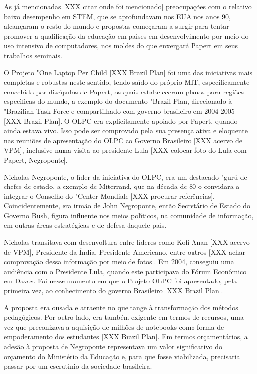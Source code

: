 \documentclass[
12pt,		%
openright,	%
twoside,  %
a4paper,			%
chapter=TITLE,		%
english,			%
french,				%
spanish,			%
brazil				%
]{USPSC-classe/USPSC}
\begin{document}
As j\'a mencionadas [XXX citar onde foi mencionado] preocupa\c{c}\~oes com o relativo baixo desempenho em STEM, que se aprofundavam nos EUA nos anos 90, alcan\c{c}aram o resto do mundo e propostas come\c{c}aram a surgir para tentar promover a qualifica\c{c}\~ao da educa\c{c}\~ao em pa\'{\i}ses em desenvolvimento por meio do uso intensivo de computadores, nos moldes do que enxergar\'a Papert em seus trabalhos seminais.




O Projeto "One Laptop Per Child [XXX Brazil Plan] foi uma das iniciativas mais completas e robustas neste sentido, tendo sa\'{\i}do  do pr\'oprio MIT, especificamente concebido por disc\'{\i}pulos de Papert, os quais estabeleceram planos para regi\~oes espec\'{\i}ficas do mundo, a exemplo do documento "Brazil Plan, direcionado \`a "Brazilian Task Force e compartilhado com governo brasileiro em 2004-2005 [XXX Brazil Plan]. O OLPC era explicitamente apoiado por Papert, quando ainda estava vivo. Isso pode ser comprovado pela sua presen\c{c}a ativa e eloquente nas reuni\~oes de apresenta\c{c}\~ao do OLPC ao Governo Brasileiro [XXX acervo de VPM], inclusive numa visita ao presidente Lula [XXX colocar foto do Lula com Papert, Negroponte].




Nicholas Negroponte, o l\'{\i}der da iniciativa do OLPC, era um destacado "gur\'u de chefes de estado, a exemplo de Miterrand, que na d\'ecada de 80 o convidara a integrar o Conselho do "Center Mondiale [XXX procurar refer\^encias]. Coincidentemente, era irm\~ao de John Negroponte, ent\~ao Secret\'ario de Estado do Governo Bush, figura influente nos meios pol\'{\i}ticos, na comunidade de informa\c{c}\~ao, em outras \'areas estrat\'egicas e de defesa daquele pa\'{\i}s. 




Nicholas transitava com desenvoltura entre l\'{\i}deres como Kofi Anan [XXX acervo de VPM], Presidente da \'India, Presidente Americano, entre outros [XXX achar comprova\c{c}\~ao dessa informa\c{c}\~ao por meio de fotos]. Em 2004, conseguiu uma audi\^encia com o Presidente Lula, quando este participava do F\'orum  Econ\^omico  em Davos. Foi nesse momento em que o Projeto OLPC foi apresentado, pela primeira vez, ao conhecimento do governo Brasileiro [XXX Brazil Plan].




A proposta era ousada e atraente no que tange \`a transforma\c{c}\~ao dos m\'etodos pedag\'ogicos. Por outro lado, era tamb\'em exigente em termos de recursos, uma vez que preconizava a aquisi\c{c}\~ao de milh\~oes de notebooks como forma de empoderamento dos estudantes [XXX Brazil Plan]. Em termos or\c{c}ament\'arios, a ades\~ao \`a proposta de Negroponte representava um valor significativo do or\c{c}amento do Minist\'erio da Educa\c{c}\~ao e, para que fosse viabilizada, precisaria passar por um escrut\'{\i}nio da sociedade brasileira.
\end{document}
